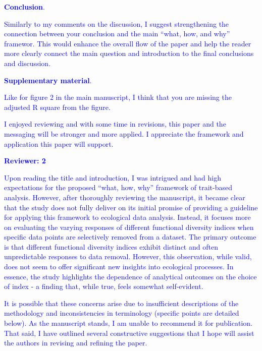 \documentclass[
]{article}
\begin{document}
\textcolor{blue}{\textbf{Conclusion}.}

\textcolor{blue}{Similarly to my comments on the discussion, I suggest strengthening the connection between your conclusion and the main ``what, how, and why'' framewor.
This would enhance the overall flow of the paper and help the reader more clearly connect the main question and introduction to the final conclusions and discussion.}

\textcolor{blue}{\textbf{Supplementary material}.}

\textcolor{blue}{Like for figure 2 in the main manuscript, I think that you are missing the adjusted R square from the figure.}

\textcolor{blue}{I enjoyed reviewing and with some time in revisions, this paper and the messaging will be stronger and more applied. I appreciate the framework and application this paper will support.}

\textcolor{blue}{\textbf{Reviewer: 2}}

\textcolor{blue}{Upon reading the title and introduction, I was intrigued and had high expectations for the proposed ``what, how, why'' framework of trait-based analysis.
However, after thoroughly reviewing the manuscript, it became clear that the study does not fully deliver on its initial promise of providing a guideline for applying this framework to ecological data analysis.
Instead, it focuses more on evaluating the varying responses of different functional diversity indices when specific data points are selectively removed from a dataset.
The primary outcome is that different functional diversity indices exhibit distinct and often unpredictable responses to data removal.
However, this observation, while valid, does not seem to offer significant new insights into ecological processes.
In essence, the study highlights the dependence of analytical outcomes on the choice of index - a finding that, while true, feels somewhat self-evident.}

\textcolor{blue}{It is possible that these concerns arise due to insufficient descriptions of the methodology and inconsistencies in terminology (specific points are detailed below).
As the manuscript stands, I am unable to recommend it for publication.
That said, I have outlined several constructive suggestions that I hope will assist the authors in revising and refining the paper.}
\end{document}

